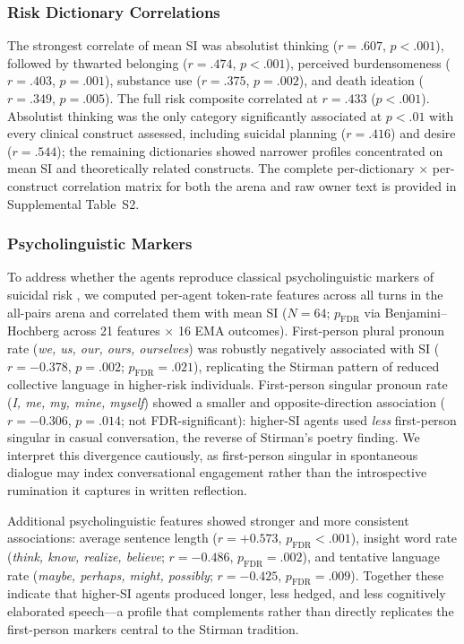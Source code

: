 \documentclass[review,12pt,authoryear]{elsarticle}
\begin{document}
\subsubsection{Risk Dictionary Correlations}

The strongest correlate of mean SI was absolutist thinking ($r = .607$, $p < .001$), followed by thwarted belonging ($r = .474$, $p < .001$), perceived burdensomeness ($r = .403$, $p = .001$), substance use ($r = .375$, $p = .002$), and death ideation ($r = .349$, $p = .005$). The full risk composite correlated at $r = .433$ ($p < .001$). Absolutist thinking was the only category significantly associated at $p < .01$ with every clinical construct assessed, including suicidal planning ($r = .416$) and desire ($r = .544$); the remaining dictionaries showed narrower profiles concentrated on mean SI and theoretically related constructs. The complete per-dictionary $\times$ per-construct correlation matrix for both the arena and raw owner text is provided in Supplemental Table~S2.

\subsubsection{Psycholinguistic Markers}

To address whether the agents reproduce classical psycholinguistic markers of suicidal risk \citep{stirman2001word}, we computed per-agent token-rate features across all turns in the all-pairs arena and correlated them with mean SI ($N = 64$; $p_{\text{FDR}}$ via Benjamini--Hochberg across 21 features $\times$ 16 EMA outcomes). First-person plural pronoun rate (\textit{we, us, our, ours, ourselves}) was robustly negatively associated with SI ($r = -0.378$, $p = .002$; $p_{\text{FDR}} = .021$), replicating the Stirman pattern of reduced collective language in higher-risk individuals. First-person singular pronoun rate (\textit{I, me, my, mine, myself}) showed a smaller and opposite-direction association ($r = -0.306$, $p = .014$; not FDR-significant): higher-SI agents used \textit{less} first-person singular in casual conversation, the reverse of Stirman's poetry finding. We interpret this divergence cautiously, as first-person singular in spontaneous dialogue may index conversational engagement rather than the introspective rumination it captures in written reflection.

Additional psycholinguistic features showed stronger and more consistent associations: average sentence length ($r = +0.573$, $p_{\text{FDR}} < .001$), insight word rate (\textit{think, know, realize, believe}; $r = -0.486$, $p_{\text{FDR}} = .002$), and tentative language rate (\textit{maybe, perhaps, might, possibly}; $r = -0.425$, $p_{\text{FDR}} = .009$). Together these indicate that higher-SI agents produced longer, less hedged, and less cognitively elaborated speech---a profile that complements rather than directly replicates the first-person markers central to the Stirman tradition.
\end{document}
